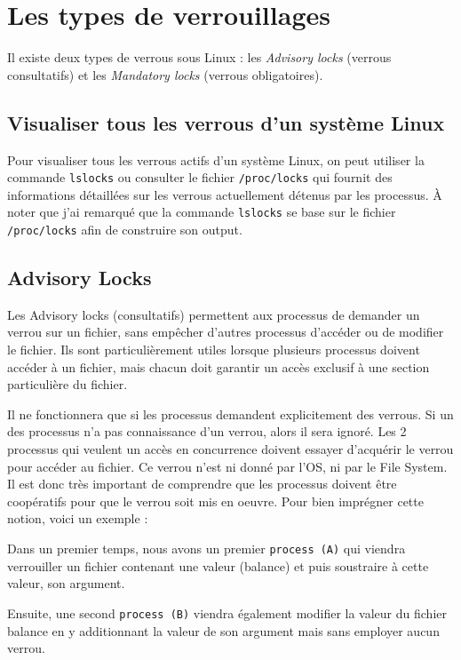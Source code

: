 \newpage
\section{Les types de verrouillages\cite{butenhof}}

Il existe deux types de verrous sous Linux : les \textit{Advisory locks} (verrous consultatifs) et les \textit{Mandatory locks} (verrous obligatoires).

\subsection{Visualiser tous les verrous d'un système Linux}

Pour visualiser tous les verrous actifs d'un système Linux, on peut utiliser la commande \texttt{lslocks} ou consulter le fichier \texttt{/proc/locks} qui fournit des informations détaillées sur les verrous actuellement détenus par les processus. À noter que j'ai remarqué que la commande \texttt{lslocks} se base sur le fichier \texttt{/proc/locks} afin de construire son output.

\subsection{Advisory Locks}

Les Advisory locks (consultatifs) permettent aux processus de demander un verrou sur un fichier, sans empêcher d'autres processus d'accéder ou de modifier le fichier. Ils sont particulièrement utiles lorsque plusieurs processus doivent accéder à un fichier, mais chacun doit garantir un accès exclusif à une section particulière du fichier. 

Il ne fonctionnera que si les processus demandent explicitement des verrous. Si un des processus n'a pas connaissance d'un verrou, alors il sera ignoré. Les 2 processus qui veulent un accès en concurrence doivent essayer d’acquérir le verrou pour accéder au fichier. Ce verrou n’est ni donné par l’OS, ni par le File System. Il est donc très important de comprendre que les processus doivent être coopératifs pour que le verrou soit mis en oeuvre.
\newline
Pour bien imprégner cette notion, voici un exemple : 

Dans un premier temps, nous avons un premier \texttt{process (A)} qui viendra verrouiller un fichier contenant une valeur (balance) et puis soustraire à cette valeur, son argument.

Ensuite, une second \texttt{process (B)} viendra également modifier la valeur du fichier balance en y additionnant la valeur de son argument mais sans employer aucun verrou.

